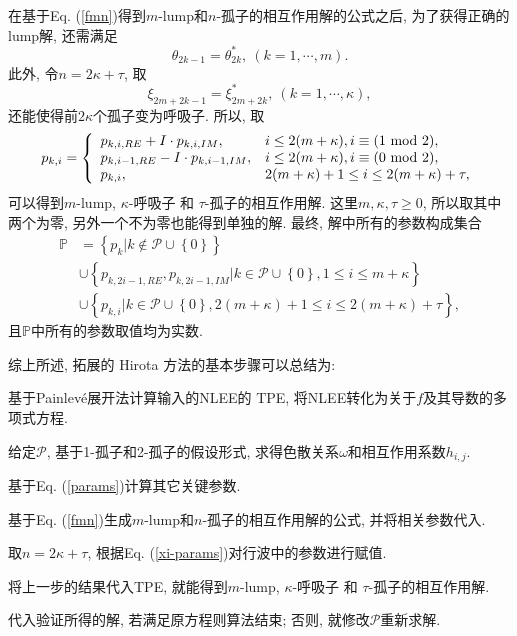 \documentclass[12pt,a4paper,UTF8]{article}
\newcommand{\bbrace}[1]{\left\{#1\right\}}
\newcommand{\PS}{\mathcal{P}}
\renewcommand{\mod}{{\rm ~mod~}}
\newcommand{\Painleve}{Painlev{\'e}}
\newcommand{\refeqn}[1]{Eq. (\ref{#1})}
\newcommand{\MLNS}{$m$-lump和$n$-孤子的相互作用解}
\begin{document}
在基于\refeqn{fmn}得到\MLNS{}的公式之后, 为了获得正确的lump解, 还需满足
\begin{equation}
  \theta_{2k-1}=\theta_{2k}^*, ~(k=1,\cdots,m).
\end{equation}
此外, 令$n=2\kappa+\tau$, 取
\begin{equation}
  \xi_{2m+2k-1}=\xi_{2m+2k}^*, ~(k=1,\cdots,\kappa),
\end{equation}
还能使得前$2\kappa$个孤子变为呼吸子. 所以, 取
\begin{equation}
p_{k,i}=\left\{
\begin{array}{ll}
  p_{k,i,RE}+I\cdot p_{k,i,IM}, & i\le 2(m+\kappa), i\equiv(1 \mod 2),\\
  p_{k,i-1,RE}-I\cdot p_{k,i-1,IM}, & i\le 2(m+\kappa), i\equiv(0 \mod 2),\\
  p_{k,i}, & 2(m+\kappa)+1 \le i \le 2(m+\kappa)+\tau ,
\end{array}
\right.
\end{equation}
可以得到$m$-lump, $\kappa$-呼吸子 和 $\tau$-孤子的相互作用解. 这里$m,\kappa,\tau\ge 0$, 所以取其中两个为零, 另外一个不为零也能得到单独的解. 最终, 解中所有的参数构成集合
\begin{equation}
\begin{aligned}
\mathbb{P}
&=\bbrace{p_k|k\not\in \PS\cup\bbrace{0}} \\
&\cup\bbrace{p_{k,2i-1,RE},p_{k,2i-1,IM}|k\in\PS\cup\bbrace{0},1\le i \le m+\kappa} \\
&\cup\bbrace{p_{k,i}|k\in\PS\cup\bbrace{0},2(m+\kappa)+1 \le i \le 2(m+\kappa)+\tau},
\end{aligned}
\label{xi-params}
\end{equation}
且$\mathbb P$中所有的参数取值均为实数. 

综上所述, 拓展的 Hirota 方法的基本步骤可以总结为: 
\begin{compactenum}[Step 1.]
\item 基于\Painleve{}展开法计算输入的NLEE的 TPE, 将NLEE转化为关于$f$及其导数的多项式方程. 
\item 给定$\PS$, 基于1-孤子和2-孤子的假设形式, 求得色散关系$\omega$和相互作用系数$h_{i,j}$.
\item 基于\refeqn{params}计算其它关键参数.
\item 基于\refeqn{fmn}生成\MLNS{}的公式, 并将相关参数代入. 
\item 取$n=2\kappa+\tau$, 根据\refeqn{xi-params}对行波中的参数进行赋值.
\item 将上一步的结果代入TPE, 就能得到$m$-lump, $\kappa$-呼吸子 和 $\tau$-孤子的相互作用解.
\item 代入验证所得的解, 若满足原方程则算法结束; 否则, 就修改$\PS$重新求解. 
\end{compactenum}
\end{document}
